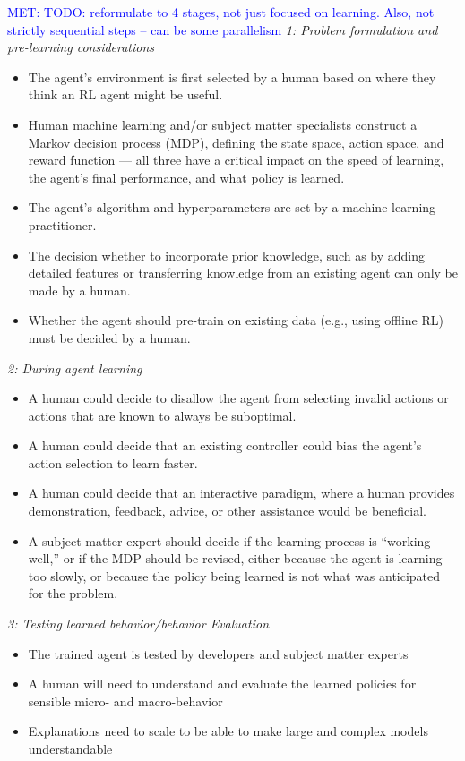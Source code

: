 \documentclass[twoside,11pt]{article}
\newcommand{\MET}[1]{\textcolor{blue}{MET: #1}}
\begin{document}
\noindent
\MET{TODO: reformulate to 4 stages, not just focused on learning. Also, not strictly sequential steps -- can be some parallelism}
\emph{1: Problem formulation and pre-learning considerations}
    \begin{itemize}
        \item The agent's environment is first selected by a human based on where they think an RL agent might be useful. 
        \item Human machine learning and/or subject matter specialists construct a Markov decision process (MDP), defining the state space, action space, and reward function --- all three have a critical impact on the speed of learning, the agent's final performance, and what policy is learned. 
        \item The agent's algorithm and hyperparameters are set by a machine learning practitioner. 
        \item The decision whether to incorporate prior knowledge, such as by adding detailed features or transferring knowledge from an existing agent 
        can only be made by a human. 
        \item Whether the agent should pre-train on existing data (e.g., using offline RL) must be decided by a human.
    \end{itemize}
\noindent
\emph{2: During agent learning}
    \begin{itemize}
        \item A human could decide to disallow the agent from selecting invalid actions or actions that are known to always be suboptimal.
        \item A human could decide that an existing controller could bias the agent's action selection to learn faster.
        \item A human could decide that an interactive paradigm, where a human provides demonstration, feedback, advice, or other assistance would be beneficial.
        \item A subject matter expert should decide if the learning process is ``working well,'' or if the MDP should be revised, either because the agent is learning too slowly, or because the policy being learned is not what was anticipated for the problem.
    \end{itemize}
\noindent
\emph{3: Testing learned behavior/behavior Evaluation}
    \begin{itemize}
        \item The trained agent is tested by developers and subject matter experts
        \item A human will need to understand and evaluate the learned policies for sensible micro- and macro-behavior
        \item Explanations need to scale to be able to make large and complex models understandable
    \end{itemize}
\end{document}
